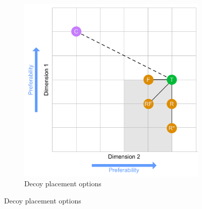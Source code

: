 
\begin{figure}[t]
	\centering
	\begin{subfigure}[t]{0.49\textwidth}
		\includegraphics[width=\textwidth]{figures/decoy/decoy-dimensions-general}
		\caption{\label{fig:decoy:general-construction}Decoy placement options \cite{Huber1982AsymetricallyDominated}}
		

\end{subfigure}
\end{figure}
